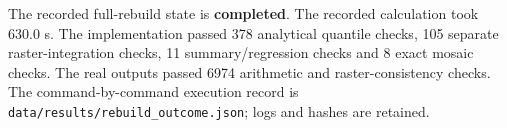 The recorded full-rebuild state is \textbf{completed}. The recorded calculation took 630.0 s. The implementation passed 378 analytical quantile checks, 105 separate raster-integration checks, 11 summary/regression checks and 8 exact mosaic checks. The real outputs passed 6974 arithmetic and raster-consistency checks. The command-by-command execution record is \texttt{data/results/rebuild\_outcome.json}; logs and hashes are retained.
